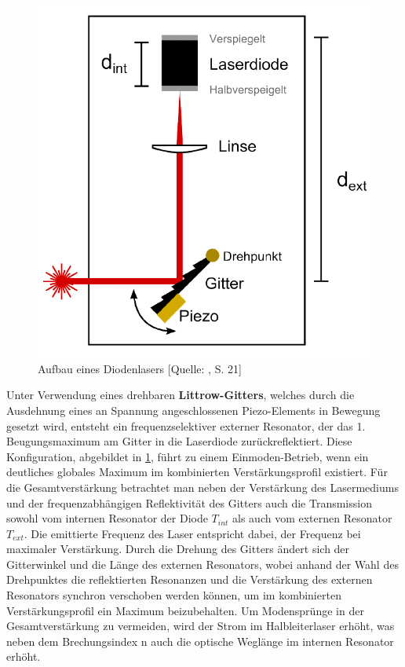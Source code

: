 \begin{figure}[!h]
    \centering
    \includegraphics[scale = 0.4]{figures/images/diodenlaser.png}
    \caption{Aufbau eines Diodenlasers [Quelle: \cite{H2}, S. 21]}
    \label{fig:littrowgitter}
\end{figure}

\noindent Unter Verwendung eines drehbaren \textbf{Littrow-Gitters}, welches durch die Ausdehnung eines an Spannung angeschlossenen Piezo-Elements in Bewegung gesetzt wird, entsteht ein frequenzselektiver externer Resonator, der das 1. Beugungsmaximum am Gitter in die Laserdiode zurückreflektiert. Diese Konfiguration, abgebildet in \ref{fig:littrowgitter}, führt zu einem Einmoden-Betrieb, wenn ein deutliches globales Maximum im kombinierten Verstärkungsprofil existiert. Für die Gesamtverstärkung betrachtet man neben der Verstärkung des Lasermediums und der frequenzabhängigen Reflektivität des Gitters auch die Transmission sowohl vom internen Resonator der Diode $T_{int}$ als auch vom externen Resonator $T_{ext}$. Die emittierte Frequenz des Laser entspricht dabei, der Frequenz bei maximaler Verstärkung. Durch die Drehung des Gitters ändert sich der Gitterwinkel und die Länge des externen Resonators, wobei anhand der Wahl des Drehpunktes die reflektierten Resonanzen und die Verstärkung des externen Resonators synchron verschoben werden können, um im kombinierten Verstärkungsprofil ein Maximum beizubehalten. Um Modensprünge in der Gesamtverstärkung zu vermeiden, wird der Strom im Halbleiterlaser erhöht, was neben dem Brechungsindex n auch die optische Weglänge im internen Resonator erhöht. \cite{H2}\\

